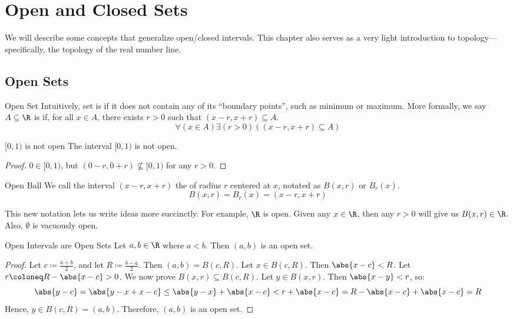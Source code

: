 \chapter{Open and Closed Sets}

We will describe some concepts that generalize open/closed intervals. This chapter also serves as a very light introduction to topology---specifically, the topology of the real number line.

\section{Open Sets}

\begin{dfnbox}{Open Set}{}
    Intuitively, set is  if it does not contain any of its ``boundary points'', such as minimum or maximum.
    \tcblower
    More formally, we say $A \subseteq \R$ is  if, for all $x \in A$, there exists $r > 0$ such that $(x-r, x+r) \subseteq A$.
    \[ \forall(x \in A) \exists (r > 0) \left( (x-r, x+r) \subseteq A \right) \]
\end{dfnbox}


\begin{exbox}{$[0,1)$ is not open}{}
    The interval $[0,1)$ is not open.
    \tcblower
    \begin{proof}
        $0 \in [0,1)$, but $(0-r, 0+r) \not \subseteq [0,1)$ for any $r > 0$.
    \end{proof}
\end{exbox}

\begin{dfnbox}{Open Ball}{}
    We call the interval $(x-r, x+r)$ the  of radius $r$ centered at $x$, notated as $B(x,r)$ or $B_r(x)$.
    \tcblower
    \[ B(x,r) = B_r(x) = (x-r, x+r) \]
\end{dfnbox}

This new notation lets us write ideas more succinctly. For example, $\R$ is open. Given any $x \in \R$, then any $r > 0$ will give us $B(x, r) \in \R$. Also, $\emptyset$ is vacuously open.

\begin{lembox}{Open Intervals are Open Sets}{}
    Let $a,b \in \R$ where $a < b$. Then $(a,b)$ is an open set.
    \tcblower
    \begin{proof}
        Let $c \coloneq \frac{a+b}{2}$, and let $R \coloneq \frac{b-a}{2}$. Then $(a,b) = B(c, R)$. Let $x \in B(c, R)$. Then $\abs{x - c} < R$. Let $r \coloneq R - \abs{x - c} > 0$. We now prove $B(x,r) \subseteq B(c,R)$. Let $y \in B(x,r)$. Then $\abs{x-y} < r$, so:
        \[ \abs{y - c} = \abs{y-x+x-c} \leq \abs{y-x} + \abs{x-c} < r + \abs{x - c} = R - \abs{x-c} + \abs{x-c} = R \]
        Hence, $y \in B(c, R) = (a,b)$. Therefore, $(a,b)$ is an open set.
    \end{proof}
\end{lembox}

